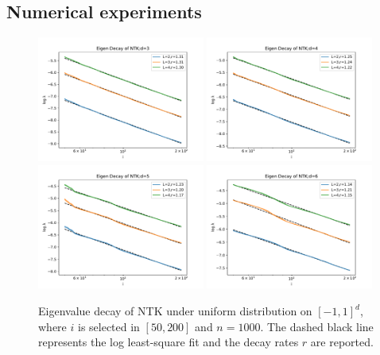 
\subsection{Numerical experiments}


\begin{figure}[t]
  \centering
  \includegraphics[width=0.49\textwidth]{fig/EigenNTKd3}
  \includegraphics[width=0.49\textwidth]{fig/EigenNTKd4}
  \includegraphics[width=0.49\textwidth]{fig/EigenNTKd5}
  \includegraphics[width=0.49\textwidth]{fig/EigenNTKd6}
  \caption{Eigenvalue decay of NTK under uniform distribution on $[-1,1]^d$,
    where $i$ is selected in $[50,200]$ and $n = 1000$.
    The dashed black line represents the log least-square fit and the decay rates $r$ are reported.}
  \label{fig:EDR1}
\end{figure}
